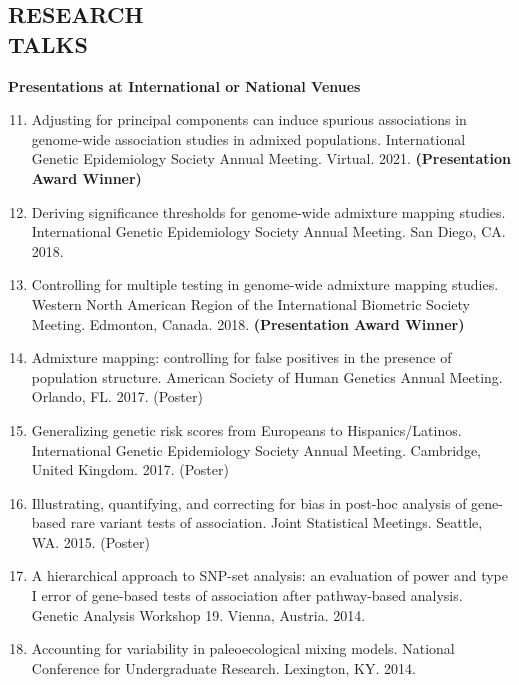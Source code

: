 \documentclass[margin]{res}
\newenvironment{benumerate}[1]{
    \let\oldItem\item
    \def\item{\addtocounter{enumi}{-2}\oldItem}
    
    \begin{enumerate}
    \setcounter{enumi}{#1}
    \addtocounter{enumi}{1}
}{
    \end{enumerate}
}
\begin{document}
\begin{resume}
\section{RESEARCH \\TALKS}

\textbf{Presentations at International or National Venues}

\begin{benumerate}{10}

\item Adjusting for principal components can induce spurious associations in genome-wide association studies in admixed populations. International Genetic Epidemiology Society Annual Meeting. Virtual. 2021. \textbf{(Presentation Award Winner)}

\item %
Deriving significance thresholds for genome-wide admixture mapping studies. International Genetic Epidemiology Society Annual Meeting. San Diego, CA. 2018. 

\item %
Controlling for multiple testing in genome-wide admixture mapping studies. Western North American Region of the International Biometric Society Meeting. Edmonton, Canada. 2018. \textbf{(Presentation Award Winner)}

\item %
Admixture mapping: controlling for false positives in the presence of population structure. American Society of Human Genetics Annual Meeting. Orlando, FL. 2017. (Poster)

\item %
Generalizing genetic risk scores from Europeans to Hispanics/Latinos. International Genetic Epidemiology Society Annual Meeting. Cambridge, United Kingdom. 2017. (Poster)

\item %
Illustrating, quantifying, and correcting for bias in post-hoc analysis of gene-based rare variant tests of association. Joint Statistical Meetings. Seattle, WA. 2015. (Poster)

\item %
A hierarchical approach to SNP-set analysis: an evaluation of power and type I error of gene-based tests of association after pathway-based analysis. Genetic Analysis Workshop 19. Vienna, Austria. 2014.

\item %
Accounting for variability in paleoecological mixing models. National Conference for Undergraduate Research. Lexington, KY. 2014.


\end{benumerate}
\end{resume}
\end{document}
